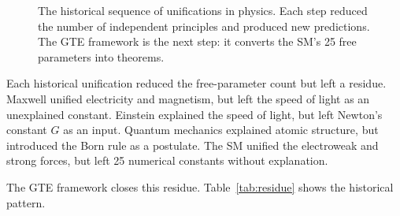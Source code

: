 \documentclass[11pt,a4paper]{article}
\begin{document}
\begin{figure}[h]
\centering
{}
\caption{The historical sequence of unifications in physics.
Each step reduced the number of independent principles and produced
new predictions. The GTE framework is the next step: it converts the
SM's 25 free parameters into theorems.}
\label{fig:unification-sequence}
\end{figure}

Each historical unification reduced the free-parameter count but left a residue.
Maxwell unified electricity and magnetism, but left the speed of light
as an unexplained constant.
Einstein explained the speed of light, but left Newton's constant $G$ as an input.
Quantum mechanics explained atomic structure, but introduced the Born rule
as a postulate.
The SM unified the electroweak and strong forces, but left 25 numerical constants
without explanation.

The GTE framework closes this residue.
Table~\ref{tab:residue} shows the historical pattern.
\end{document}
